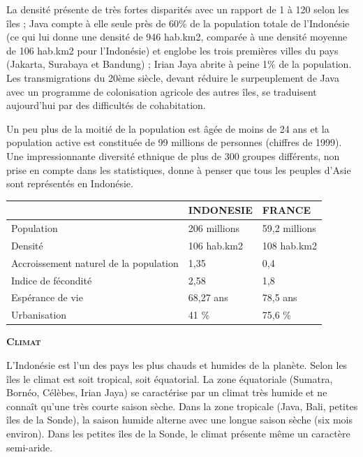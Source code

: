 La densité présente de très fortes disparités avec un rapport de 1 à 120 selon les îles ; Java compte à elle seule près de 60\% de la population totale de l'Indonésie (ce qui lui donne une densité de 946 hab.km2, comparée à une densité moyenne de 106 hab.km2 pour l'Indonésie) et englobe les trois premières villes du pays (Jakarta, Surabaya et Bandung) ; Irian Jaya abrite à peine 1\% de la population. Les transmigrations du 20ème siècle, devant réduire le surpeuplement de Java avec un programme de colonisation agricole des autres îles, se traduisent aujourd'hui par des difficultés de cohabitation.

Un peu plus de la moitié de la population est âgée de moins de 24 ans et la population active est constituée de 99 millions de personnes (chiffres de 1999). Une impressionnante diversité ethnique de plus de 300 groupes différents, non prise en compte dans les statistiques, donne à penser que tous les peuples d'Asie sont représentés en Indonésie.


\hspace*{-0.65cm}
\begin{tabularx}{8cm}{|l|l|l|}
    \hline
    & INDONESIE & FRANCE \\
    \hline
    Population & 206 millions & 59,2 millions \\
    \hline
    Densité & 106 hab.km2 & 108 hab.km2 \\
    \hline
    Accroissement naturel de la population & 1,35 & 0,4 \\
    \hline
    Indice de fécondité & 2,58 & 1,8 \\
    \hline
    Espérance de vie & 68,27 ans & 78,5 ans \\
    \hline
    Urbanisation & 41 \% & 75,6 \% \\
    \hline
\end{tabularx}


\textbf{\textsc{Climat}}

L'Indonésie est l'un des pays les plus chauds et humides de la planète. Selon les îles le climat est soit tropical, soit équatorial. La zone équatoriale (Sumatra, Bornéo, Célèbes, Irian Jaya) se caractérise par un climat très humide et ne connaît qu'une très courte saison sèche. Dans la zone tropicale (Java, Bali, petites îles de la Sonde), la saison humide alterne avec une longue saison sèche (six mois environ). Dans les petites îles de la Sonde, le climat présente même un caractère semi-aride.

